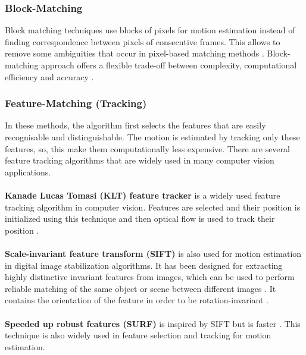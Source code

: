 \subsubsection{Block-Matching}
Block matching techniques use blocks of pixels for motion estimation instead of finding correspondence between pixels of consecutive frames. This allows to remove some ambiguities that occur in pixel-based matching methods \citep{dis_review}. Block-matching approach offers a flexible trade-off between complexity, computational efficiency and accuracy \citep{dis_review}.

\subsubsection{Feature-Matching (Tracking)}
In these methods, the algorithm first selects the features that are easily recognisable and distinguishable. The motion is estimated by tracking only these features, so, this make them computationally less expensive. There are several feature tracking algorithms that are widely used in many computer vision applications.

\paragraph{}\textbf{Kanade Lucas Tomasi (KLT) feature tracker} \citep{tomasi1991detection} is a widely used feature tracking algorithm in computer vision. Features are selected and their position is initialized using this technique and then optical flow is used to track their position \citep{dis_review}.

\paragraph{}\textbf{Scale-invariant feature transform (SIFT)} is also used for motion estimation in digital image stabilization algorithms.  It has been designed for extracting highly distinctive invariant features from images, which can be used to perform reliable matching of the same object or scene between different images \citep{battiato2007sift}. It contains the orientation of the feature in order to be rotation-invariant \citep{dis_review}.

\paragraph{}\textbf{Speeded up robust features (SURF)} is inspired by SIFT but is faster \citep{dis_surf}. This technique is also widely used in feature selection and tracking for motion estimation.

